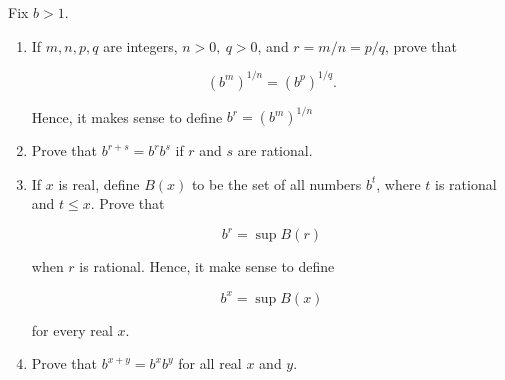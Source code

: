Fix $b > 1$.

\begin{enumerate}
	\item If $m,n,p,q$ are integers, $n > 0,~q > 0$, and $r = m/n = p/q$, prove that

	$$(b^m)^{1/n} = (b^p)^{1/q}.$$
	
	Hence, it makes sense to define $b^r = (b^m)^{1/n}$
	\item Prove that $b^{r+s} = b^rb^s$ if $r$ and $s$ are rational.
	\item If $x$ is real, define $B(x)$ to be the set of all numbers $b^t$, where $t$ is rational and $t \leq x$. Prove that
	
	$$b^r = \sup B(r)$$
	
	when $r$ is rational. Hence, it make sense to define
	
	$$b^x = \sup B(x)$$
	
	for every real $x$.
	\item Prove that $b^{x+y} = b^xb^y$ for all real $x$ and $y$.
\end{enumerate}


